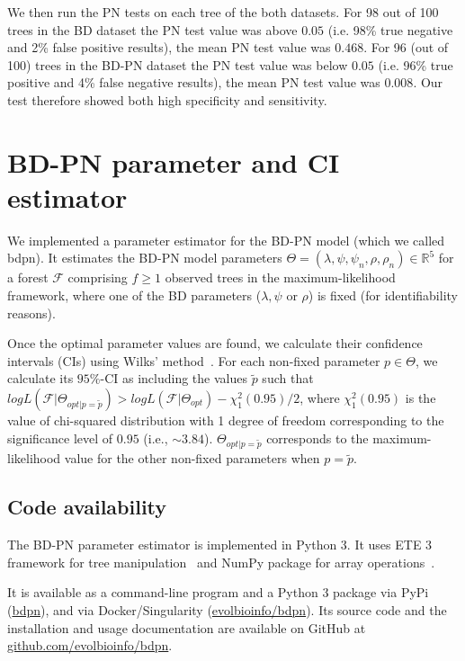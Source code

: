 \documentclass[a4paper,10pt]{article}
\begin{document}
We then run the PN tests on each tree of the both datasets. For 98 out of 100 trees in the BD dataset the PN test value was above $0.05$ (i.e. 98\% true negative and 2\% false positive results), the mean PN test value was $0.468$. For 96 (out of 100) trees in the BD-PN dataset the PN test value was below $0.05$ (i.e. 96\% true positive and 4\% false negative results), the mean PN test value was $0.008$.
Our test therefore showed both high specificity and sensitivity.
 

\section{BD-PN parameter and CI estimator}
We implemented a parameter estimator for the BD-PN model (which we called bdpn). It estimates the BD-PN model parameters  $\Theta = (\lambda,\psi,\psi_n,\rho,\rho_n) \in \mathbb{R}^5$ for a forest $\mathscr{F}$ comprising $f \geq 1$ observed trees in the maximum-likelihood framework, where one of the BD parameters ($\lambda,\psi$ or $\rho$) is fixed (for identifiability reasons). 

Once the optimal parameter values are found, we calculate their confidence intervals (CIs) using Wilks' method~\citep{Wilks1938}.
For each non-fixed parameter $p \in \Theta$, we calculate its $95\%$-CI as including the values $\tilde{p}$ such that $log L(\mathscr{F}|\Theta_{opt|p=\tilde{p}}) > log L(\mathscr{F}| \Theta_{opt}) - \chi^2_1(0.95) / 2$, where $\chi^2_1(0.95)$ is the value of chi-squared distribution with 1 degree of freedom corresponding to the significance level of $0.95$ (i.e., $\sim3.84$). $\Theta_{opt|p=\tilde{p}}$ corresponds to the maximum-likelihood value for the other non-fixed parameters when $p = \tilde{p}$. 

\subsection*{Code availability}
The BD-PN parameter estimator is implemented in Python 3. It uses ETE 3 framework for tree manipulation~\cite{Huerta-Cepas2016} and NumPy package for array operations~\cite{harris_array_2020}. 

It is available as a command-line program and a Python 3 package via PyPi (\href{https://pypi.org/project/bdpn}{bdpn}), and via Docker/Singularity (\href{https://hub.docker.com/r/evolbioinfo/bdpn/tags}{evolbioinfo/bdpn}). Its source code and the installation and usage documentation are available on GitHub at \href{https://github.com/evolbioinfo/bdpn}{github.com/evolbioinfo/bdpn}.
\end{document}

